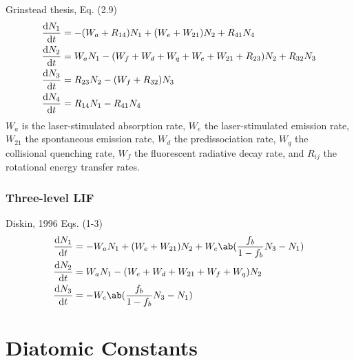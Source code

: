 \documentclass[11pt, twoside, fleqn]{report}
\begin{document}
Grinstead thesis, Eq. (2.9)
\begin{align*}
    \odv{N_{1}}{t} & = -(W_{a} + R_{14})N_{1} + (W_{e} + W_{21})N_{2} + R_{41}N_{4}                      \\
    \odv{N_{2}}{t} & = W_{a}N_{1} - (W_{f} + W_{d} + W_{q} + W_{e} + W_{21} + R_{23})N_{2} + R_{32}N_{3} \\
    \odv{N_{3}}{t} & = R_{23}N_{2} - (W_{f} + R_{32})N_{3}                                               \\
    \odv{N_{4}}{t} & = R_{14}N_{1} - R_{41}N_{4}
\end{align*}
$W_{a}$ is the laser-stimulated absorption rate, $W_{e}$ the laser-stimulated emission rate, $W_{21}$ the spontaneous emission rate, $W_{d}$ the predissociation rate, $W_{q}$ the collisional quenching rate, $W_{f}$ the fluorescent radiative decay rate, and $R_{ij}$ the rotational energy transfer rates.

\subsection{Three-level LIF}

Diskin, 1996 Eqs. (1-3)
\begin{align*}
    \odv{N_{1}}{t} & = -W_{a}N_{1} + (W_{e} + W_{21})N_{2} + W_{c}\ab(\frac{f_{b}}{1 - f_{b}}N_{3} - N_{1}) \\
    \odv{N_{2}}{t} & = W_{a}N_{1} - (W_{e} + W_{d} + W_{21} + W_{f} + W_{q})N_{2}                           \\
    \odv{N_{3}}{t} & = -W_{c}\ab(\frac{f_{b}}{1 - f_{b}}N_{3} - N_{1})
\end{align*}

\appendix
\chapter{Diatomic Constants}
\label{a:diatomic_constants}
\end{document}
